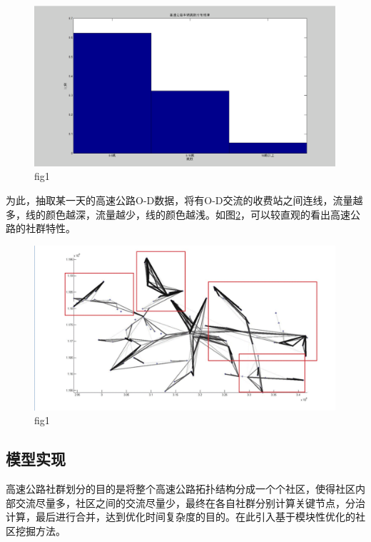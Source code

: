 			\begin{figure}[h]
			\centering
					\begin{minipage}{0.8\linewidth}
						\centering
						\includegraphics[width=4.4in]{picture/tiaoshu}
						\caption[这是一个有味道的图]{fig1}
						\label{fig4}
					\end{minipage}%
			\end{figure}

			为此，抽取某一天的高速公路O-D数据，将有O-D交流的收费站之间连线，流量越多，线的颜色越深，流量越少，线的颜色越浅。如图\ref{fig5}，可以较直观的看出高速公路的社群特性。

			\begin{figure}[h]
			\centering
					\begin{minipage}{0.8\linewidth}
						\centering
						\includegraphics[width=4.4in]{picture/shequntexing}
						\caption{fig1}
						\label{fig5}
					\end{minipage}%
			\end{figure}
		\subsection{模型实现}
			高速公路社群划分的目的是将整个高速公路拓扑结构分成一个个社区，使得社区内部交流尽量多，社区之间的交流尽量少，最终在各自社群分别计算关键节点，分治计算，最后进行合并，达到优化时间复杂度的目的。在此引入基于模块性优化的社区挖掘方法。

